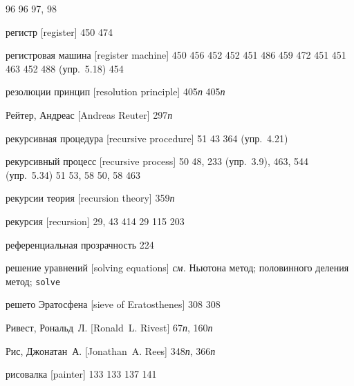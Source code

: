 \begin{theindex}
   96
   96
   97, 98
\item {регистр [register]} 450
   474
\item {регистровая машина [register machine]} 450
   456
   452
   452
   451
   486
   459
   472
   451
   451
   463
   452
   488 (упр.~5.18)
   454
\item {резолюции принцип [resolution principle]} 405{\it п}
   405{\it п}
\item {Рейтер, Андреас [Andreas Reuter]} 297{\it п}
\item {рекурсивная процедура [recursive procedure]}
   51
   43
   364 (упр.~4.21)
\item {рекурсивный процесс [recursive process]} 50
   48, 233 (упр.~3.9), 463, 544 (упр.~5.34)
   51
   53, 58
   50, 58
   463
\item {рекурсии теория [recursion theory]} 359{\it п}
\item {рекурсия [recursion]} 29, 43
   414
   29
   115
   203
\item {референциальная прозрачность} 224
\item {решение уравнений [solving equations]} {\it см.} Ньютона метод; половинного деления метод; \texttt{solve}
\item {решето Эратосфена [sieve of Eratosthenes]} 308
   308
\item {Ривест, Рональд~Л. [Ronald~L. Rivest]} 67{\it п}, 160{\it п}
\item {Рис, Джонатан~А. [Jonathan~A. Rees]} 348{\it п}, 366{\it п}
\item {рисовалка [painter]} 133
   133
   137
   141

\end{theindex}
